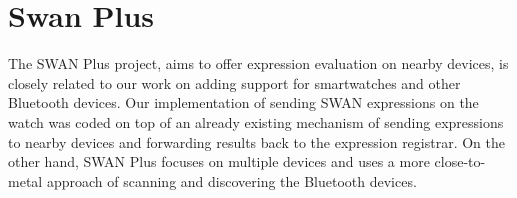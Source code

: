 \section{Swan Plus}
The SWAN Plus\cite{swan_plus} project,  aims to offer expression evaluation on nearby devices, is closely related to our work on adding support for smartwatches and other Bluetooth devices.
Our implementation of sending SWAN expressions on the watch was coded on top of an already existing mechanism of sending expressions to nearby devices and forwarding results back to the expression
registrar. On the other hand, SWAN Plus focuses on multiple devices and uses a more close-to-metal approach of scanning and discovering the Bluetooth devices.

